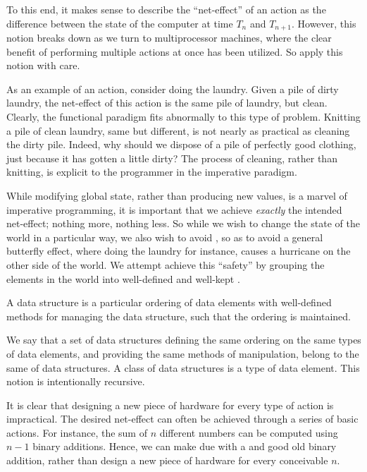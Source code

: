 To this end, it makes sense to describe the ``net-effect'' of an action as the
difference between the state of the computer at time $T_n$ and $T_{n+1}$.
However, this notion breaks down as we turn to multiprocessor machines, where
the clear benefit of performing multiple actions at once has been utilized. So
apply this notion with care.


As an example of an action, consider doing the laundry. Given a pile of dirty
laundry, the net-effect of this action is the same pile of laundry, but clean.
Clearly, the functional paradigm fits abnormally to this type of problem.
Knitting a pile of clean laundry, same but different, is not nearly as
practical as cleaning the dirty pile. Indeed, why should we dispose of a pile
of perfectly good clothing, just because it has gotten a little dirty? The
process of cleaning, rather than knitting, is explicit to the programmer in the
imperative paradigm.

While modifying global state, rather than producing new values, is a marvel of
imperative programming, it is important that we achieve \emph{exactly} the
intended net-effect; nothing more, nothing less. So while we wish to change the
state of the world in a particular way, we also wish to avoid
, so as to avoid a general butterfly effect, where doing the
laundry for instance, causes a hurricane on the other side of the world. We
attempt achieve this ``safety'' by grouping the elements in the world into
well-defined and well-kept .

\begin{definition}

A data structure is a particular ordering of data elements with well-defined
methods for managing the data structure, such that the ordering is maintained.

\end{definition}

We say that a set of data structures defining the same ordering on the same
types of data elements, and providing the same methods of manipulation, belong
to the same  of data structures. A class of data structures is a
type of data element. This notion is intentionally recursive.

It is clear that designing a new piece of hardware for every type of action is
impractical. The desired net-effect can often be achieved through a series of
basic actions. For instance, the sum of $n$ different numbers can be computed
using $n-1$ binary additions. Hence, we can make due with a  and good old binary addition, rather than design a new piece of
hardware for every conceivable $n$.

